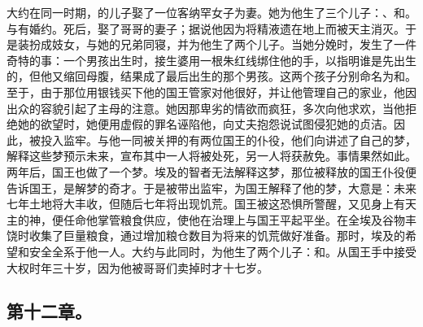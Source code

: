 大约在同一时期，的儿子娶了一位客纳罕女子为妻。她为他生了三个儿子：、和。与有婚约。死后，娶了哥哥的妻子；据说他因为将精液遗在地上而被天主消灭。于是装扮成妓女，与她的兄弟同寝，并为他生了两个儿子。当她分娩时，发生了一件奇特的事：一个男孩出生时，接生婆用一根朱红线绑住他的手，以指明谁是先出生的，但他又缩回母腹，结果成了最后出生的那个男孩。这两个孩子分别命名为和。\newline{}至于，由于那位用银钱买下他的国王管家对他很好，并让他管理自己的家业，他因出众的容貌引起了主母的注意。她因那卑劣的情欲而疯狂，多次向他求欢，当他拒绝她的欲望时，她便用虚假的罪名诬陷他，向丈夫抱怨说试图侵犯她的贞洁。因此，被投入监牢。与他一同被关押的有两位国王的仆役，他们向讲述了自己的梦，解释这些梦预示未来，宣布其中一人将被处死，另一人将获赦免。事情果然如此。两年后，国王也做了一个梦。埃及的智者无法解释这梦，那位被释放的国王仆役便告诉国王，是解梦的奇才。于是被带出监牢，为国王解释了他的梦，大意是：未来七年土地将大丰收，但随后七年将出现饥荒。国王被这恐惧所警醒，又见身上有天主的神，便任命他掌管粮食供应，使他在治理上与国王平起平坐。在全埃及谷物丰饶时收集了巨量粮食，通过增加粮仓数目为将来的饥荒做好准备。那时，埃及的希望和安全全系于他一人。大约与此同时，为他生了两个儿子：和。从国王手中接受大权时年三十岁，因为他被哥哥们卖掉时才十七岁。\par


\subsection{第十二章。}

